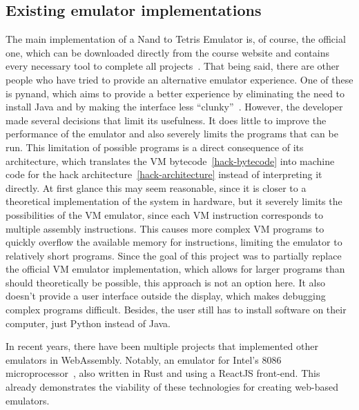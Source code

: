 \subsection{Existing emulator implementations}
The main implementation of a Nand to Tetris Emulator is, of course, the official one, which can be downloaded directly from the course website and contains every necessary tool to complete all projects~\cite[Software]{n2tweb}.
\label{pynand}
That being said, there are other people who have tried to provide an alternative emulator experience.
One of these is pynand, which aims to provide a better experience by eliminating the need to install Java and by making the interface less ``clunky''~\cite{pynand}.
However, the developer made several decisions that limit its usefulness.
It does little to improve the performance of the emulator and also severely limits the programs that can be run.
This limitation of possible programs is a direct consequence of its architecture, which translates the VM bytecode~\ref{hack-bytecode} into machine code for the hack architecture~\ref{hack-architecture} instead of interpreting it directly.
At first glance this may seem reasonable, since it is closer to a theoretical implementation of the system in hardware, but it severely limits the possibilities of the VM emulator, since each VM instruction corresponds to multiple assembly instructions.
This causes more complex VM programs to quickly overflow the available memory for instructions, limiting the emulator to relatively short programs.
Since the goal of this project was to partially replace the official VM emulator implementation, which allows for larger programs than should theoretically be possible, this approach is not an option here.
It also doesn't provide a user interface outside the display, which makes debugging complex programs difficult.
Besides, the user still has to install software on their computer, just Python instead of Java.


In recent years, there have been multiple projects that implemented other emulators in WebAssembly. Notably, an emulator for Intel's 8086 microprocessor~\cite{9824078}, also written in Rust and using a ReactJS front-end. This already demonstrates the viability of these technologies for creating web-based emulators.

